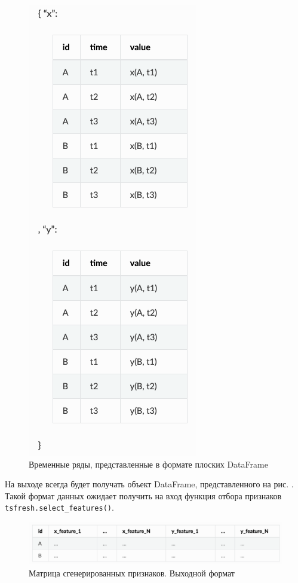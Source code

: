 \documentclass[%
	11pt,
	a4paper,
	utf8,
		]{article}
\begin{document}
\begin{figure}[h]
	\centering
	\includegraphics[scale=0.55]{figures/dict_flat_df_ts.png}
	\caption{ Временные ряды, представленные в формате плоских DataFrame }\label{fig:dict_flat_df_ts}
\end{figure}

На выходе всегда будет получать объект DataFrame, представленного на рис. . Такой формат данных ожидает получить на вход функция отбора признаков \texttt{tsfresh.select\_features()}.

\begin{figure}[h]
	\centering
	\includegraphics[scale=0.25]{figures/output_ts.png}
	\caption{ Матрица сгенерированных признаков. Выходной формат }\label{fig:output_ts}
\end{figure}
\end{document}
